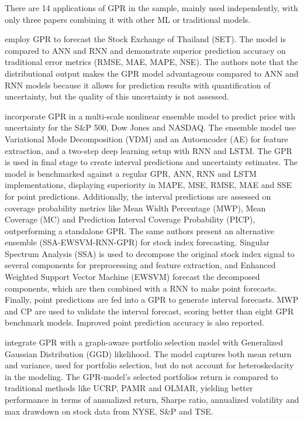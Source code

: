 There are 14 applications of GPR in the sample, mainly used independently, with only three papers combining it with other ML or traditional models. 

\textcite{Suphawan2022gpr} employ GPR to forecast the Stock Exchange of Thailand (SET). The model is compared to ANN and RNN and demonstrate superior prediction accuracy on traditional error metrics (RMSE, MAE, MAPE, NSE). The authors note that the distributional output makes the GPR model advantageous compared to ANN and RNN models because it allows for prediction results with quantification of uncertainty, but the quality of this uncertainty is not assessed. 

\textcite{Wang2021gpr} incorporate GPR in a multi-scale nonlinear ensemble model to predict price with uncertainty for the S\&P 500, Dow Jones and NASDAQ. The ensemble model use Variational Mode Decomposition (VDM) and an Autoencoder (AE) for feature extraction, and a two-step deep learning setup with RNN and LSTM. The GPR is used in final stage to create interval predictions and uncertainty estimates. The model is benchmarked against a regular GPR, ANN, RNN and LSTM implementations, displaying superiority in MAPE, MSE, RMSE, MAE and SSE for point predictions. Additionally, the interval predictions are assessed on coverage probability metrics like Mean Width Percentage (MWP), Mean Coverage (MC) and Prediction Interval Coverage Probability (PICP), outperforming a standalone GPR. The same authors \parencite{Wang2021gprensemble} present an alternative ensemble (SSA-EWSVM-RNN-GPR) for stock index forecasting. Singular Spectrum Analysis (SSA) is used to decompose the original stock index signal to several components for preprocessing and feature extraction, and Enhanced Weighted Support Vector Machine (EWSVM) forecast the decomposed components, which are then combined with a RNN to make point forecasts. Finally, point predictions are fed into a GPR to generate interval forecasts. MWP and CP are used to validate the interval forecast, scoring better than eight GPR benchmark models. Improved point prediction accuracy is also reported.

\textcite{Li2024gpr} integrate GPR with a graph-aware portfolio selection model with Generalized Gaussian Distribution (GGD) likelihood. The model captures both mean return and variance, used for portfolio selection, but do not account for heteroskedacity in the modeling. The GPR-model's selected portfolios return is compared to traditional methods like UCRP, PAMR and OLMAR, yielding better performance in terms of annualized return, Sharpe ratio, annualized volatility and max drawdown on stock data from NYSE, S\&P and TSE.

